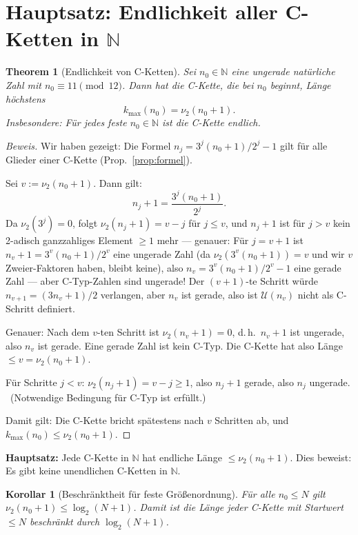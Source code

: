 \documentclass[12pt,a4paper]{article}
\newtheorem{theorem}[definition]{Theorem}
\newtheorem{korollar}[definition]{Korollar}
\newenvironment{beweis}{\begin{proof}[Beweis]}{\end{proof}}
\newcommand{\vii}{\nu_2}
\newcommand{\U}{\mathcal{U}}
\newcommand{\N}{\mathbb{N}}
\begin{document}
\section{Hauptsatz: Endlichkeit aller C-Ketten in $\N$}

\begin{theorem}[Endlichkeit von C-Ketten]
\label{thm:endlich}
Sei $n_0 \in \N$ eine ungerade natürliche Zahl mit $n_0 \equiv 11 \pmod{12}$.
Dann hat die C-Kette, die bei $n_0$ beginnt, Länge höchstens
\[
  k_{\max}(n_0) = \vii(n_0+1).
\]
Insbesondere: Für jedes feste $n_0 \in \N$ ist die C-Kette endlich.
\end{theorem}

\begin{beweis}
Wir haben gezeigt: Die Formel $n_j = 3^j(n_0+1)/2^j - 1$ gilt für alle
Glieder einer C-Kette (Prop.~\ref{prop:formel}).

Sei $v := \vii(n_0+1)$. Dann gilt:
\[
  n_j + 1 = \frac{3^j(n_0+1)}{2^j}.
\]
Da $\vii(3^j) = 0$, folgt $\vii(n_j+1) = v - j$ für $j \leq v$,
und $n_j+1$ ist für $j > v$ kein 2-adisch ganzzahliges Element $\geq 1$ mehr ---
genauer: Für $j = v+1$ ist $n_v + 1 = 3^v(n_0+1)/2^v$ eine ungerade Zahl
(da $\vii(3^v(n_0+1)) = v$ und wir $v$ Zweier-Faktoren haben, bleibt keine),
also $n_v = 3^v(n_0+1)/2^v - 1$ eine gerade Zahl --- aber C-Typ-Zahlen
sind ungerade! Der $(v+1)$-te Schritt würde $n_{v+1} = (3n_v+1)/2$
verlangen, aber $n_v$ ist gerade, also ist $\U(n_v)$ nicht als
C-Schritt definiert.

Genauer: Nach dem $v$-ten Schritt ist $\vii(n_v + 1) = 0$, d.\,h.\
$n_v + 1$ ist ungerade, also $n_v$ ist gerade. Eine gerade Zahl ist
kein C-Typ. Die C-Kette hat also Länge $\leq v = \vii(n_0+1)$.

Für Schritte $j < v$: $\vii(n_j+1) = v - j \geq 1$, also $n_j+1$ gerade,
also $n_j$ ungerade. \checkmark\ (Notwendige Bedingung für C-Typ ist erfüllt.)

Damit gilt: Die C-Kette bricht spätestens nach $v$ Schritten ab, und
$k_{\max}(n_0) \leq \vii(n_0+1)$.
\end{beweis}

\begin{tcolorbox}[ergebnis]
\textbf{Hauptsatz:} Jede C-Kette in $\N$ hat endliche Länge $\leq \vii(n_0+1)$.
Dies beweist: Es gibt keine unendlichen C-Ketten in $\N$.
\end{tcolorbox}

\begin{korollar}[Beschränktheit für feste Größenordnung]
Für alle $n_0 \leq N$ gilt $\vii(n_0+1) \leq \log_2(N+1)$.
Damit ist die Länge jeder C-Kette mit Startwert $\leq N$ beschränkt durch
$\log_2(N+1)$.
\end{korollar}
\end{document}
